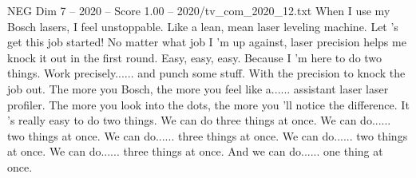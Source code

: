 \begin{textsample}{NEG Dim 7 – 2020 – Score 1.00 – 2020/tv\_com\_2020\_12.txt}  \label{ex:f7_neg_009}
When I use my Bosch lasers, I feel unstoppable.
Like a lean, mean laser leveling machine.
Let 's get this job started!
No matter what job I 'm up against, laser precision helps me knock it out in the first round.
Easy, easy, easy.
Because I 'm here to do two things.
Work precisely...... and punch some stuff.
With the precision to knock the job out.
The more you Bosch, the more you feel like a...... assistant laser laser profiler.
The more you look into the dots, the more you 'll notice the difference.
It 's really easy to do two things.
We can do three things at once.
We can do...... two things at once.
We can do...... three things at once.
We can do...... two things at once.
We can do...... three things at once.
And we can do...... one thing at once.

\end{textsample}
